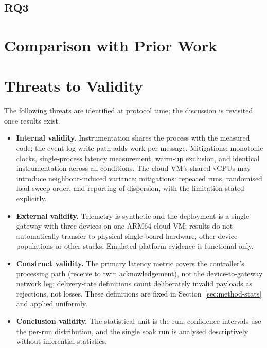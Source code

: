 \subsection{RQ3}

\section{Comparison with Prior Work}
\label{sec:eval-comparison}

\noindent {}

\section{Threats to Validity}
\label{sec:eval-validity}

\noindent The following threats are identified at protocol time; the
discussion is revisited once results exist.

\begin{itemize}
  \item \textbf{Internal validity.} Instrumentation shares the process with
        the measured code; the event-log write path adds work per message.
        Mitigations: monotonic clocks, single-process latency measurement,
        warm-up exclusion, and identical instrumentation across all
        conditions. The cloud \ac{VM}'s shared vCPUs may introduce
        neighbour-induced variance; mitigations: repeated runs, randomised
        load-sweep order, and reporting of dispersion, with the limitation
        stated explicitly.
  \item \textbf{External validity.} Telemetry is synthetic and the deployment
        is a single gateway with three devices on one ARM64 cloud \ac{VM};
        results do not automatically transfer to physical single-board
        hardware, other device populations or other stacks. Emulated-platform
        evidence is functional only.
  \item \textbf{Construct validity.} The primary latency metric covers the
        controller's processing path (receive to twin acknowledgement), not
        the device-to-gateway network leg; delivery-rate definitions count
        deliberately invalid payloads as rejections, not losses. These
        definitions are fixed in Section~\ref{sec:method-stats} and applied
        uniformly.
  \item \textbf{Conclusion validity.} The statistical unit is the run;
        confidence intervals use the per-run distribution, and the single
        soak run is analysed descriptively without inferential statistics.
\end{itemize}
